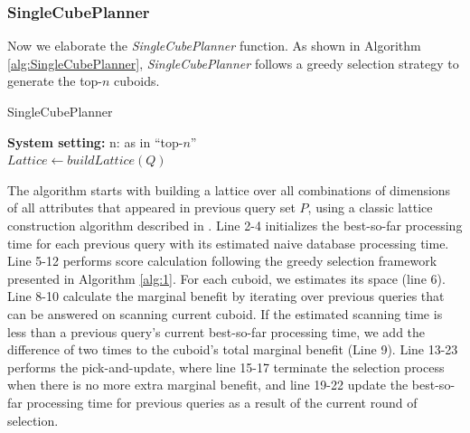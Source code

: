 	\subsubsection{SingleCubePlanner}
	\label{SingleCubePlanner}
	
	Now we elaborate the \emph{SingleCubePlanner} function. As shown in Algorithm \ref{alg:SingleCubePlanner}, \emph{SingleCubePlanner} follows a greedy selection strategy to generate the top-$n$ cuboids.
	
	\begin{algorithm}%
		\label{alg:SingleCubePlanner}
		\caption{SingleCubePlanner}
		\LinesNumbered
		\textbf{System setting:} n: as in ``top-$n$''\\
		$Lattice \leftarrow buildLattice(Q)$\;
		
	\end{algorithm}
	
	
	The algorithm starts with building a lattice over all combinations of dimensions of all attributes that appeared in previous query set $P$, using a classic lattice construction algorithm described in \cite{DBLP:journals/ipl/NourineR99}. Line 2-4 initializes the best-so-far processing time for each previous query with its estimated naive database processing time. Line 5-12 performs score calculation following the greedy selection framework presented in Algorithm \ref{alg:1}. For each cuboid, we estimates its space (line 6). Line 8-10 calculate the marginal benefit by iterating over previous queries that can be answered on scanning current cuboid. If the estimated scanning time is less than a previous query's current best-so-far processing time, we add the difference of two times to the cuboid's total marginal benefit (Line 9). Line 13-23 performs the pick-and-update, where line 15-17 terminate the selection process when there is no more extra marginal benefit, and line 19-22 update the best-so-far processing time for previous queries as a result of the current round of selection.
	

